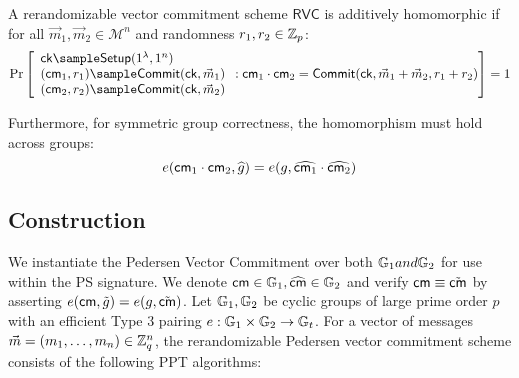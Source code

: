 \begin{definition}
A rerandomizable vector commitment scheme $\mathsf{RVC}$ is additively homomorphic if for all $\vec{m}_1, \vec{m}_2 \in \mathcal{M}^n$ and randomness $r_1, r_2 \in \mathbb{Z}_p$:
\[
    \Pr\left[
    \begin{array}{l}
        \mathsf{ck} \sample \mathsf{Setup}(1^\lambda, 1^n) \\
        (\cm_1, r_1) \sample \mathsf{Commit}(\mathsf{ck}, \vec{m}_1) \\
        (\cm_2, r_2) \sample \mathsf{Commit}(\mathsf{ck}, \vec{m}_2)
    \end{array}
    : \cm_1 \cdot \cm_2 = \mathsf{Commit}(\mathsf{ck}, \vec{m}_1 + \vec{m}_2, r_1 + r_2)
    \right] = 1
\]

\noindent Furthermore, for symmetric group correctness, the homomorphism must hold across groups:
\[
    e(\mathsf{cm}_1 \cdot \mathsf{cm}_2, \widehat{g}) = e(g, \widehat{\mathsf{cm}_1} \cdot \widehat{\mathsf{cm}_2})
\]
\end{definition}



\subsection{Construction}

We instantiate the Pedersen Vector Commitment over both $\mathbb{G}_1 and \mathbb{G}_2$ for use within the PS signature. We denote $\mathsf{cm} \in \mathbb{G}_1, \widehat{\mathsf{cm}} \in \mathbb{G}_2$ and verify $\mathsf{cm} \equiv \tilde{\mathsf{cm}}$ by asserting $e(\mathsf{cm}, \tilde{g}) = e(g, \tilde{\mathsf{cm}})$. 
Let $\mathbb{G}_1, \mathbb{G}_2$ be cyclic groups of large prime order $p$ with an efficient Type 3 pairing $e : \mathbb{G}_1 \times \mathbb{G}_2 \to \mathbb{G}_t$. 
For a vector of messages $\vec{m} = (m_1, \ldots, m_n) \in \mathbb{Z}_q^n$, the rerandomizable Pedersen vector commitment scheme consists of the following PPT algorithms:

